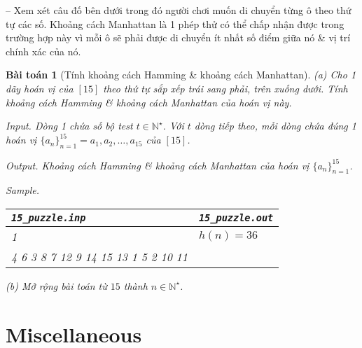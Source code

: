\documentclass{article}
\newtheorem{baitoan}{Bài toán}
\begin{document}
-- Xem xét câu đố bên dưới trong đó người chơi muốn di chuyển từng ô theo thứ tự các số. Khoảng cách Manhattan là 1 phép thử có thể chấp nhận được trong trường hợp này vì mỗi ô sẽ phải được di chuyển ít nhất số điểm giữa nó \& vị trí chính xác của nó.

\begin{baitoan}[Tính khoảng cách Hamming \& khoảng cách Manhattan]
	 (a) Cho 1 dãy hoán vị của $[15]$ theo thứ tự sắp xếp trái sang phải, trên xuống dưới. Tính khoảng cách Hamming \& khoảng cách Manhattan của hoán vị này.
	 \item {\sf Input.} Dòng 1 chứa số bộ test $t\in\mathbb{N}^\star$. Với $t$ dòng tiếp theo, mỗi dòng chứa đúng 1 hoán vị $\{a_n\}_{n=1}^{15} = a_1,a_2,\ldots,a_{15}$ của $[15]$.
	 \item {\sf Output.} Khoảng cách Hamming \& khoảng cách Manhattan của hoán vị $\{a_n\}_{n=1}^{15}$.
	 \item {\sf Sample.}
	 \begin{table}[H]
	 	\centering
	 	\begin{tabular}{|l|l|}
	 		\hline
	 		\verb|15_puzzle.inp| & \verb|15_puzzle.out| \\
	 		\hline
	 		1 & $h(n) = 36$ \\
	 		4 6 3 8 7 12 9 14 15 13 1 5 2 10 11 &  \\
	 		\hline
	 	\end{tabular}
	 \end{table}
	 \noindent(b) Mở rộng bài toán từ $15$ thành $n\in\mathbb{N}^\star$.
\end{baitoan}


\section{Miscellaneous}


\printbibliography[heading=bibintoc]
	
\end{document}
